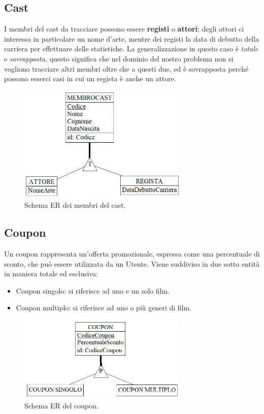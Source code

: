 \documentclass[a4paper,12pt]{report}
\begin{document}
	\subsection{Cast}
	I membri del cast da tracciare possono essere \textbf{registi} o \textbf{attori}; degli attori ci interessa in particolare un nome d'arte, mentre dei registi la data di debutto della carriera per effettuare delle statistiche. La generalizzazione in questo caso è \textit{totale} e \textit{sovrapposta}, questo significa che nel dominio del nostro problema non si vogliono tracciare altri membri oltre che a questi due, ed è sovrapposta perché possono esserci casi in cui un regista è anche un attore.
	\begin{figure}[H]
		\centering
		\includegraphics[width=230pt]{ER/cast.png}
		\caption{Schema ER dei membri del cast.}
	\end{figure}
	
	\subsection{Coupon}
	Un coupon rappresenta un'offerta promozionale, espressa come una percentuale di sconto, che può essere utilizzata da un Utente. Viene suddiviso in due sotto entità in maniera totale ed esclusiva:
	\begin{itemize}
			\item Coupon singolo: si riferisce ad uno e un solo film.
			\item Coupon multiplo: si riferisce ad uno o più generi di film.
	\end{itemize}
	\begin{figure}[H]
		\centering
		\includegraphics[width=230pt]{ER/coupon.png}
		\caption{Schema ER del coupon.}
	\end{figure}
\end{document}

